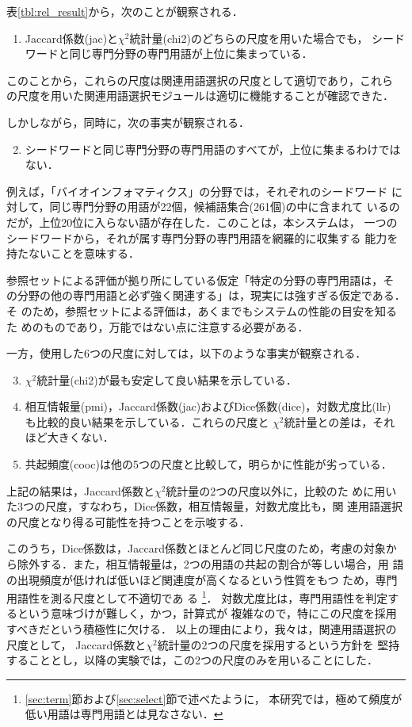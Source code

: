 \mbox{表\ref{tbl:rel_result}}から，次のことが観察される．
\begin{enumerate}
\item
Jaccard係数(jac)と$\chi^2$統計量(chi2)のどちらの尺度を用いた場合でも，
シードワードと同じ専門分野の専門用語が上位に集まっている．
\end{enumerate}

このことから，これらの尺度は関連用語選択の尺度として適切であり，これら
の尺度を用いた関連用語選択モジュールは適切に機能することが確認できた．

しかしながら，同時に，次の事実が観察される．
\begin{enumerate} \setcounter{enumi}{1}
\item 
シードワードと同じ専門分野の専門用語のすべてが，上位に集まるわけではない．
\end{enumerate}

例えば，「バイオインフォマティクス」の分野では，それぞれのシードワード
に対して，同じ専門分野の用語が22個，候補語集合(261個)の中に含まれて
いるのだが，上位20位に入らない語が存在した．このことは，本システムは，
一つのシードワードから，それが属す専門分野の専門用語を網羅的に収集する
能力を持たないことを意味する．

参照セットによる評価が拠り所にしている仮定「特定の分野の専門用語は，そ
の分野の他の専門用語と必ず強く関連する」は，現実には強すぎる仮定である．そ
のため，参照セットによる評価は，あくまでもシステムの性能の目安を知るた
めのものであり，万能ではない点に注意する必要がある．

一方，使用した6つの尺度に対しては，以下のような事実が観察される．
\begin{enumerate} \setcounter{enumi}{2}
\item 
$\chi^2$統計量(chi2)が最も安定して良い結果を示している．
\item 
相互情報量(pmi)，Jaccard係数(jac)およびDice係数(dice)，対数尤度比(llr)
も比較的良い結果を示している．これらの尺度と
$\chi^2$統計量との差は，それほど大きくない．
\item 
共起頻度(cooc)は他の5つの尺度と比較して，明らかに性能が劣っている．
\end{enumerate}

上記の結果は，Jaccard係数と$\chi^2$統計量の2つの尺度以外に，比較のた
めに用いた3つの尺度，すなわち，Dice係数，相互情報量，対数尤度比も，関
連用語選択の尺度となり得る可能性を持つことを示唆する．

このうち，Dice係数は，Jaccard係数とほとんど同じ尺度のため，考慮の対象か
ら除外する．また，相互情報量は，2つの用語の共起の割合が等しい場合，用
語の出現頻度が低ければ低いほど関連度が高くなるという性質をもつ
\cite[pp.~182]{manning99fsnlp}ため，専門用語性を測る尺度として不適切であ
る
\footnote{\mbox{\ref{sec:term}節}および\mbox{\ref{sec:select}節}で述べたように，
本研究では，極めて頻度が低い用語は専門用語とは見なさない．}．
対数尤度比は，専門用語性を判定するという意味づけが難しく，かつ，計算式が
複雑なので，特にこの尺度を採用すべきだという積極性に欠ける．
以上の理由により，我々は，関連用語選択の尺度として，
Jaccard係数と$\chi^2$統計量の2つの尺度を採用するという方針を
堅持することとし，以降の実験では，この2つの尺度のみを用いることにした．

